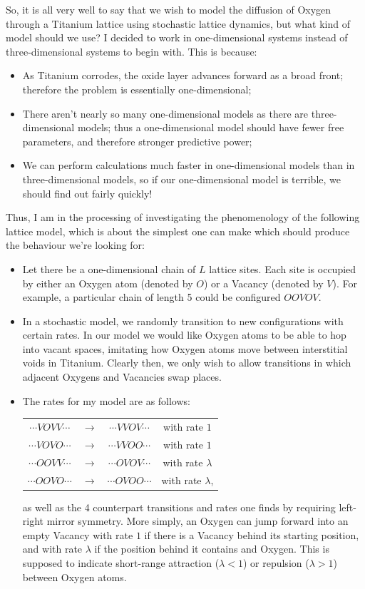 So, it is all very well to say that we wish to model the diffusion of Oxygen through a Titanium lattice using stochastic lattice dynamics, but what kind of model should we use? I decided to work in
one-dimensional systems instead of three-dimensional systems to begin with. This is because:
\begin{itemize}
 \item As Titanium corrodes, the oxide layer advances forward as a broad front; therefore the problem is essentially one-dimensional;
 \item There aren't nearly so many one-dimensional models as there are three-dimensional models; thus a one-dimensional model should have fewer free parameters, and therefore stronger predictive power;
 \item We can perform calculations much faster in one-dimensional models than in three-dimensional models, so if our one-dimensional model is terrible, we should find out fairly quickly!
\end{itemize}
Thus, I am in the processing of investigating the phenomenology of the following lattice model, which is about the simplest one can make which should produce the behaviour we're looking for:
\begin{itemize}
 \item Let there be a one-dimensional chain of $L$ lattice sites. Each site is occupied by either an Oxygen atom (denoted by $O$) or a Vacancy (denoted by $V$). For example, a particular
 chain of length 5 could be configured $OOVOV$.
 \item In a stochastic model, we randomly transition to new configurations with certain rates. In our model we would like Oxygen atoms to be able to hop into vacant spaces, imitating how Oxygen atoms move
 between interstitial voids in Titanium. Clearly then, we only wish to allow
 transitions in which adjacent Oxygens and Vacancies swap places. 
 \item The rates for my model are as follows:
 \begin{center}
  \begin{tabular}{c c c c}
  $\cdots VOVV\cdots$ & $\longrightarrow$ & $\cdots VVOV \cdots$ & with rate $1$ \\
  $\cdots VOVO\cdots$ & $\longrightarrow$ & $\cdots VVOO \cdots$ & with rate $1$ \\
  $\cdots OOVV\cdots$ & $\longrightarrow$ & $\cdots OVOV \cdots$ & with rate $\lambda$ \\
  $\cdots OOVO\cdots$ & $\longrightarrow$ & $\cdots OVOO \cdots$ & with rate $\lambda$, \\
 \end{tabular}
 \end{center}
 as well as the 4 counterpart transitions and rates one finds by requiring left-right mirror symmetry. More simply, an Oxygen can jump forward into an empty Vacancy with rate $1$ if there is a Vacancy behind its starting
 position, and with rate $\lambda$ if the position behind it contains and Oxygen. This is supposed to indicate short-range attraction ($\lambda < 1$) or repulsion ($\lambda > 1$) between Oxygen atoms.

\end{itemize}

